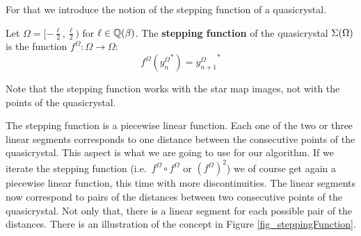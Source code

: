 \documentclass[text.tex]{subfiles}
\begin{document}
For that we introduce the notion of the stepping function of a quasicrystal. 

\begin{definition}
\label{def_steppingFunction}
Let $\Omega = [-\frac{\ell}{2},\frac{\ell}{2})$ for $\ell\in\mathbb{Q}(\beta)$. The \textbf{stepping function} of the quasicrystal $\Sigma(\Omega)$ is the function $f^\Omega: \Omega \to \Omega$: 
$$f^\Omega ({y^\Omega_{n}}^\ast) = {y^\Omega_{n+1}}^\ast$$ 
\end{definition}

\begin{remark}
Note that the stepping function works with the star map images, not with the points of the quasicrystal. 
\end{remark}

The stepping function is a piecewise linear function. Each one of the two or three linear segments corresponds to one distance between the consecutive points of the quasicrystal. This aspect is what we are going to use for our algorithm. If we iterate the stepping function (i.e.~$f^\Omega\circ{}f^\Omega$ or $(f^\Omega)^2$) we of course get again a piecewise linear function, this time with more discontinuities. The linear segments now correspond to pairs of the distances between two consecutive points of the quasicrystal. Not only that, there is a linear segment for each possible pair of the distances. There is an illustration of the concept in Figure \ref{fig_steppingFunction}. 
\end{document}
